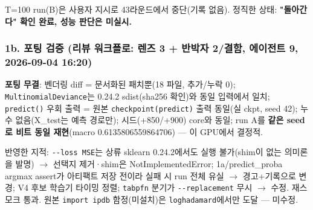 \par\noindent \textbullet\enspace T=\allowbreak{}100 run(B)은 사용자 지시로 43라운드에서 중단(기록 없음). 정직한 상태: \textbf{"돌아간다" 확인 완료, 성능 판단은 미실시.}


\subsubsection{1b. 포팅 검증 (리뷰 워크플로: 렌즈 3 +\allowbreak{} 반박자 2/\allowbreak{}결함, 에이전트 9, 2026-09-04 16:20)}
\par\noindent \textbullet\enspace \textbf{포팅 무결}: 벤더링 diff =\allowbreak{} 문서화된 패치뿐(18 파일, 추가/\allowbreak{}누락 0); \texttt{Multinom\allowbreak{}ialDevia\allowbreak{}nce}는 0.24.2 sdist(sha256 확인)와 동일 입력에서 일치; \texttt{predict(\allowbreak{})} 우회 출력 =\allowbreak{} 원본 \texttt{checkpoi\allowbreak{}nt(predi\allowbreak{}ct)} 출력 동일(실 ckpt, seed 42); 누수 없음(X\_\allowbreak{}test는 예측 경로만); 시드(+\allowbreak{}850/\allowbreak{}+\allowbreak{}900) core와 동일; run A를 \textbf{같은 seed로 비트 동일 재현}(macro 0.6135806559864706) — 이 GPU에서 결정적.


\par\noindent \textbullet\enspace 반영한 지적: \texttt{-\allowbreak{}-\allowbreak{}loss M\allowbreak{}SE}는 상류 sklearn 0.24.2에서도 실행 불가(shim이 없는 의미론을 발명)  \ensuremath{\rightarrow}  선택지 제거·shim은 NotImplementedError; 1a/\allowbreak{}predict\_\allowbreak{}proba argmax assert가 아티팩트 저장 전이라 실패 시 run 전체 유실  \ensuremath{\rightarrow}  경고+\allowbreak{}기록으로 변경; V4 후보 학습기 타이밍 정렬; \texttt{tabpfn} 분기가 \texttt{-\allowbreak{}-\allowbreak{}replac\allowbreak{}ement} 무시  \ensuremath{\rightarrow}  수정. 재스모크 통과. 원본 \texttt{import i\allowbreak{}pdb} 함정(미설치)은 \texttt{loghadam\allowbreak{}ard}에서만 도달 — 미수정.


